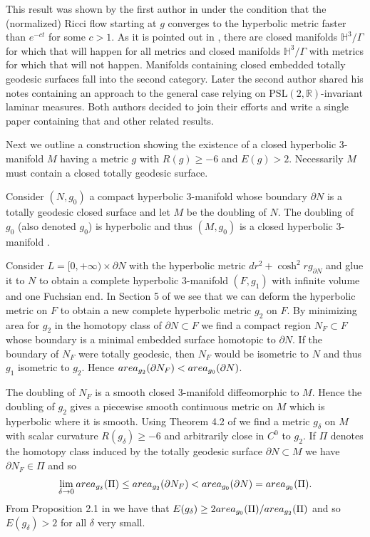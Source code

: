 \documentclass[11pt]{amsart}
\def\R{\mathbb R}
\def\H{\mathbb H}
\theoremstyle{remark}
\theoremstyle{definition}
\begin{document}
{	This result was shown by the first author in \cite{lowe} under the condition that the (normalized) Ricci flow starting at $g$ converges to the hyperbolic metric faster than $e^{-ct}$ for some $c>1$. As it is pointed out in \cite{lowe}, there are  closed manifolds  $\H^3/ \Gamma$ for which that will happen for all metrics and  closed manifolds  $\H^3/ \Gamma$ with metrics for which that will not happen.  Manifolds containing closed embedded totally geodesic  surfaces fall into the second category. 
	Later the second author shared his notes containing an approach to the general case relying on $\text {PSL}(2,\R)$-invariant laminar measures. Both authors decided to join their efforts and write a single paper containing that and other related results.  
	
	{Next we outline a construction showing the existence of  a closed hyperbolic $3$-manifold $M$ having a metric $g$  with $R(g)\geq -6$ and  $E(g)>2$.  Necessarily $M$ must contain a closed totally geodesic surface. 
	
Consider $(N,g_0)$ a compact hyperbolic $3$-manifold whose boundary $\partial N$ is a totally geodesic closed surface and let $M$ be the doubling of $N$. The doubling of $g_0$  (also denoted $g_0$) is hyperbolic and thus $(M,g_0)$ is a closed hyperbolic $3$-manifold .

 Consider $L=[0,
+\infty)\times \partial N$ with the hyperbolic metric $dr^2+\cosh^2 rg_{\partial N}$  and glue it to $N$ to obtain a complete hyperbolic $3$-manifold $(F,g_1)$ with infinite volume and one Fuchsian end. In Section 5 of \cite{thurston} we see that we can deform the hyperbolic metric on $F$ to obtain a new complete hyperbolic metric $g_2$ on $F$. By minimizing area for $g_2$ in the homotopy class of $\partial N\subset F$ we find a compact region $N_F\subset F$ whose boundary is a minimal embedded surface homotopic to $\partial N$. If the boundary of  $N_F$ were totally geodesic, then $N_F$ would be isometric to $N$ and thus $g_1$ isometric to $g_2$. Hence ${\rm area}_{g_2}(\partial N_F)<{\rm area}_{g_0}(\partial N)$.

The doubling of $N_F$  is a smooth closed $3$-manifold diffeomorphic to $M$. Hence  the doubling of $g_2$ gives a piecewise smooth continuous metric on  $M$ which is hyperbolic where it is smooth. Using Theorem 4.2 of \cite{agol-storm-thurston} we find a metric $g_{\delta}$ on $M$ with scalar curvature $R(g_\delta)\geq -6$ and arbitrarily close in $C^0$ to $g_2$. If $\Pi$ denotes the homotopy class induced by the totally geodesic surface $\partial N\subset M$  we have $\partial N_F\in \Pi$ and  
	so $$\lim_{\delta\to 0}{\rm area}_{g_\delta}(\Pi)\leq {\rm area}_{g_2}(\partial N_F)<{\rm area}_{g_0}(\partial N)={\rm area}_{g_0}(\Pi).$$
From Proposition 2.1	 in \cite{marques-neves-conf} we have that $E(g_\delta)\geq 2  {\rm area}_{g_0}(\Pi)/ {\rm area}_{g_2}(\Pi)$ and so $E(g_\delta)>2$ for all $
\delta$ very small.}
	
}
\end{document}
